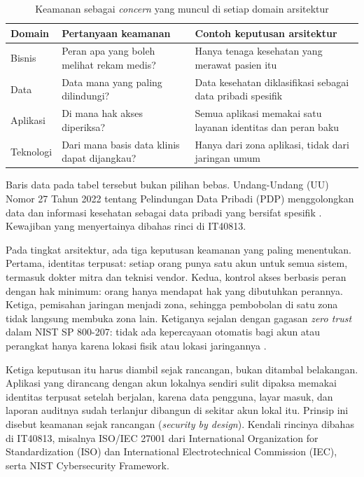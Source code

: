 \begin{table}[!htb]
  \centering
  \caption{Keamanan sebagai \textit{concern} yang muncul di setiap domain
           arsitektur}
  \label{tab:ch10-keamanan}
  \small
  \begin{tabularx}{\textwidth}{lXX}
    \hline
    \textbf{Domain} & \textbf{Pertanyaan keamanan} & \textbf{Contoh keputusan arsitektur} \\
    \hline
    Bisnis & Peran apa yang boleh melihat rekam medis? & Hanya tenaga kesehatan yang merawat pasien itu \\
    \hline
    Data & Data mana yang paling dilindungi? & Data kesehatan diklasifikasi sebagai data pribadi spesifik \\
    \hline
    Aplikasi & Di mana hak akses diperiksa? & Semua aplikasi memakai satu layanan identitas dan peran baku \\
    \hline
    Teknologi & Dari mana basis data klinis dapat dijangkau? & Hanya dari zona aplikasi, tidak dari jaringan umum \\
    \hline
  \end{tabularx}
\end{table}

Baris data pada tabel tersebut bukan pilihan bebas. Undang-Undang (UU) Nomor 27
Tahun 2022 tentang Pelindungan Data Pribadi (PDP) menggolongkan data dan
informasi kesehatan sebagai data pribadi yang bersifat spesifik
\cite{uu27-2022-pdp}. Kewajiban yang menyertainya dibahas rinci di IT40813.

Pada tingkat arsitektur, ada tiga keputusan keamanan yang paling menentukan.
Pertama, identitas terpusat: setiap orang punya satu akun untuk semua sistem,
termasuk dokter mitra dan teknisi vendor. Kedua, kontrol akses berbasis peran
dengan hak minimum: orang hanya mendapat hak yang dibutuhkan perannya. Ketiga,
pemisahan jaringan menjadi zona, sehingga pembobolan di satu zona tidak
langsung membuka zona lain. Ketiganya sejalan dengan gagasan \textit{zero
trust} dalam NIST SP 800-207: tidak ada kepercayaan otomatis bagi akun atau
perangkat hanya karena lokasi fisik atau lokasi jaringannya
\cite{c10-nist800207}.

Ketiga keputusan itu harus diambil sejak rancangan, bukan ditambal
belakangan. Aplikasi yang dirancang dengan akun lokalnya sendiri sulit
dipaksa memakai identitas terpusat setelah berjalan, karena data pengguna,
layar masuk, dan laporan auditnya sudah terlanjur dibangun di sekitar akun
lokal itu. Prinsip ini disebut keamanan sejak rancangan (\textit{security by
design}). Kendali rincinya dibahas di IT40813, misalnya ISO/IEC 27001 dari
International Organization for Standardization (ISO) dan International
Electrotechnical Commission (IEC), serta NIST Cybersecurity Framework.

